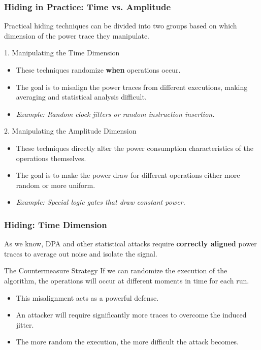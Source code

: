 \begin{frame}
    \frametitle{Hiding in Practice: Time vs. Amplitude}
    
    Practical hiding techniques can be divided into two groups based on which dimension of the power trace they manipulate.
    
    \begin{block}{1. Manipulating the Time Dimension}
        \begin{itemize}
            \item These techniques randomize \textbf{when} operations occur.
            \item The goal is to misalign the power traces from different executions, making averaging and statistical analysis difficult.
            \item \textit{Example: Random clock jitters or random instruction insertion.}
        \end{itemize}
    \end{block}
    
    \begin{block}{2. Manipulating the Amplitude Dimension}
        \begin{itemize}
            \item These techniques directly alter the power consumption characteristics of the operations themselves.
            \item The goal is to make the power draw for different operations either more random or more uniform.
            \item \textit{Example: Special logic gates that draw constant power.}
        \end{itemize}
    \end{block}
    
\end{frame}


\begin{frame}
    \frametitle{Hiding: Time Dimension}

    As we know, DPA and other statistical attacks require \textbf{correctly aligned} power traces to average out noise and isolate the signal.

    \begin{alertblock}{The Countermeasure Strategy}
        If we can randomize the execution of the algorithm, the operations will occur at different moments in time for each run.
    \end{alertblock}

    \begin{itemize}
        \item This misalignment acts as a powerful defense.
        \item An attacker will require significantly more traces to overcome the induced jitter.
        \item The more random the execution, the more difficult the attack becomes.
    \end{itemize}

\end{frame}

